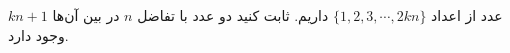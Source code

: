 \EXERCISE
$kn + 1$
عدد از اعداد
$\{1, 2, 3, \cdots, 2kn\}$
داریم. ثابت کنید دو عدد با تفاضل
$n$
در بین آن‌ها وجود دارد.